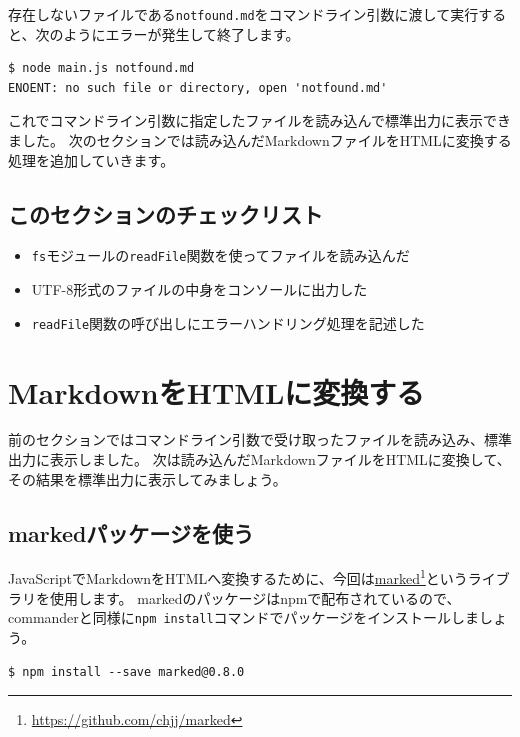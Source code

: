 存在しないファイルである\texttt{notfound.md}をコマンドライン引数に渡して実行すると、次のようにエラーが発生して終了します。

\begin{lstlisting}
$ node main.js notfound.md
ENOENT: no such file or directory, open 'notfound.md'
\end{lstlisting}

これでコマンドライン引数に指定したファイルを読み込んで標準出力に表示できました。
次のセクションでは読み込んだMarkdownファイルをHTMLに変換する処理を追加していきます。

\hypertarget{section-checklist}{%
\subsection{このセクションのチェックリスト}\label{section-checklist}}

\begin{itemize}
\item
  \texttt{fs}モジュールの\texttt{readFile}関数を使ってファイルを読み込んだ
\item
  UTF-8形式のファイルの中身をコンソールに出力した
\item
  \texttt{readFile}関数の呼び出しにエラーハンドリング処理を記述した
\end{itemize}

\hypertarget{md-to-html}{%
\section{MarkdownをHTMLに変換する}\label{md-to-html}}

前のセクションではコマンドライン引数で受け取ったファイルを読み込み、標準出力に表示しました。
次は読み込んだMarkdownファイルをHTMLに変換して、その結果を標準出力に表示してみましょう。

\hypertarget{use-marked-package}{%
\subsection{markedパッケージを使う}\label{use-marked-package}}

JavaScriptでMarkdownをHTMLへ変換するために、今回は\href{https://github.com/chjj/marked}{marked}\footnote{\url{https://github.com/chjj/marked}}というライブラリを使用します。
markedのパッケージはnpmで配布されているので、commanderと同様に\texttt{npm install}コマンドでパッケージをインストールしましょう。

\begin{lstlisting}
$ npm install --save marked@0.8.0
\end{lstlisting}

